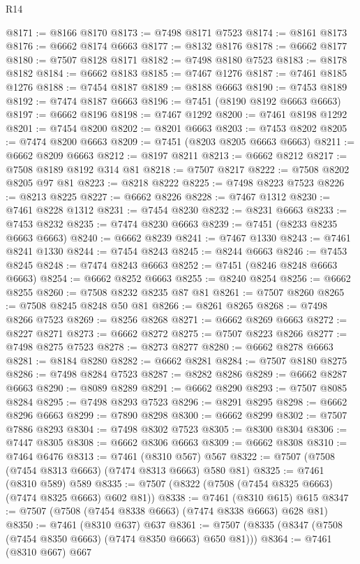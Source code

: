 \begin{lexlean}{R14}
\begin{coremodule}
@8171 := @8166 @8170
@8173 := @7498 @8171 @7523
@8174 := @8161 @8173
@8176 := @6662 @8174 @6663
@8177 := @8132 @8176
@8178 := @6662 @8177
@8180 := @7507 @8128 @8171
@8182 := @7498 @8180 @7523
@8183 := @8178 @8182
@8184 := @6662 @8183
@8185 := @7467 @1276
@8187 := @7461 @8185 @1276
@8188 := @7454 @8187
@8189 := @8188 @6663
@8190 := @7453 @8189
@8192 := @7474 @8187 @6663
@8196 := @7451 (@8190 @8192 @6663 @6663)
@8197 := @6662 @8196
@8198 := @7467 @1292
@8200 := @7461 @8198 @1292
@8201 := @7454 @8200
@8202 := @8201 @6663
@8203 := @7453 @8202
@8205 := @7474 @8200 @6663
@8209 := @7451 (@8203 @8205 @6663 @6663)
@8211 := @6662 @8209 @6663
@8212 := @8197 @8211
@8213 := @6662 @8212
@8217 := @7508 @8189 @8192 @314 @81
@8218 := @7507 @8217
@8222 := @7508 @8202 @8205 @97 @81
@8223 := @8218 @8222
@8225 := @7498 @8223 @7523
@8226 := @8213 @8225
@8227 := @6662 @8226
@8228 := @7467 @1312
@8230 := @7461 @8228 @1312
@8231 := @7454 @8230
@8232 := @8231 @6663
@8233 := @7453 @8232
@8235 := @7474 @8230 @6663
@8239 := @7451 (@8233 @8235 @6663 @6663)
@8240 := @6662 @8239
@8241 := @7467 @1330
@8243 := @7461 @8241 @1330
@8244 := @7454 @8243
@8245 := @8244 @6663
@8246 := @7453 @8245
@8248 := @7474 @8243 @6663
@8252 := @7451 (@8246 @8248 @6663 @6663)
@8254 := @6662 @8252 @6663
@8255 := @8240 @8254
@8256 := @6662 @8255
@8260 := @7508 @8232 @8235 @87 @81
@8261 := @7507 @8260
@8265 := @7508 @8245 @8248 @50 @81
@8266 := @8261 @8265
@8268 := @7498 @8266 @7523
@8269 := @8256 @8268
@8271 := @6662 @8269 @6663
@8272 := @8227 @8271
@8273 := @6662 @8272
@8275 := @7507 @8223 @8266
@8277 := @7498 @8275 @7523
@8278 := @8273 @8277
@8280 := @6662 @8278 @6663
@8281 := @8184 @8280
@8282 := @6662 @8281
@8284 := @7507 @8180 @8275
@8286 := @7498 @8284 @7523
@8287 := @8282 @8286
@8289 := @6662 @8287 @6663
@8290 := @8089 @8289
@8291 := @6662 @8290
@8293 := @7507 @8085 @8284
@8295 := @7498 @8293 @7523
@8296 := @8291 @8295
@8298 := @6662 @8296 @6663
@8299 := @7890 @8298
@8300 := @6662 @8299
@8302 := @7507 @7886 @8293
@8304 := @7498 @8302 @7523
@8305 := @8300 @8304
@8306 := @7447 @8305
@8308 := @6662 @8306 @6663
@8309 := @6662 @8308
@8310 := @7464 @6476
@8313 := @7461 (@8310 @567) @567
@8322 := @7507 (@7508 (@7454 @8313 @6663) (@7474 @8313 @6663) @580 @81)
@8325 := @7461 (@8310 @589) @589
@8335 := @7507 (@8322 (@7508 (@7454 @8325 @6663) (@7474 @8325 @6663) @602 @81))
@8338 := @7461 (@8310 @615) @615
@8347 := @7507 (@7508 (@7454 @8338 @6663) (@7474 @8338 @6663) @628 @81)
@8350 := @7461 (@8310 @637) @637
@8361 := @7507 (@8335 (@8347 (@7508 (@7454 @8350 @6663) (@7474 @8350 @6663) @650 @81)))
@8364 := @7461 (@8310 @667) @667

\end{coremodule}
\end{lexlean}

